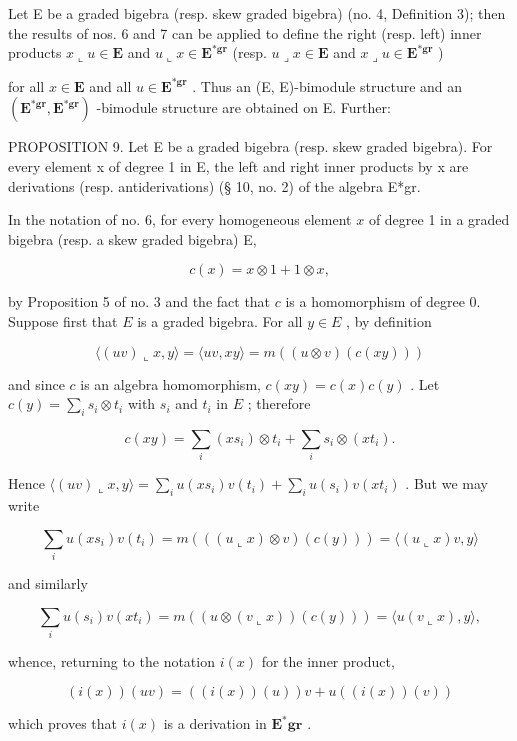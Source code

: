 Let E be a graded bigebra (resp. skew graded bigebra) (no. 4, Definition 3); then the results of nos. 6 and 7 can be applied to define the right (resp. left) inner products \(x \llcorner u \in \mathbf{E}\) and \(u \llcorner x \in \mathbf{E}^{*\mathbf{gr}}\) (resp. \(u \lrcorner x \in \mathbf{E}\) and \(x \lrcorner u \in \mathbf{E}^{*\mathbf{gr}}\) )

for all \(x \in \mathbf{E}\) and all \(u \in \mathbf{E}^{*\mathbf{gr}}\) . Thus an (E, E)-bimodule structure and an \((\mathbf{E}^{*\mathbf{gr}}, \mathbf{E}^{*\mathbf{gr}})\) -bimodule structure are obtained on E. Further:

PROPOSITION 9. Let E be a graded bigebra (resp. skew graded bigebra). For every element x of degree 1 in E, the left and right inner products by x are derivations (resp. antiderivations) (§ 10, no. 2) of the algebra E*gr.

In the notation of no. 6, for every homogeneous element \(x\) of degree 1 in a graded bigebra (resp. a skew graded bigebra) E,

\[
c (x) = x \otimes 1 + 1 \otimes x,
\]

by Proposition 5 of no. 3 and the fact that \(c\) is a homomorphism of degree 0. Suppose first that \(E\) is a graded bigebra. For all \(y \in E\) , by definition

\[
\langle (u v) \llcorner x, y \rangle = \langle u v, x y \rangle = m ((u \otimes v) (c (x y)))
\]

and since \(c\) is an algebra homomorphism, \(c(xy) = c(x)c(y)\) . Let \(c(y) = \sum_{i} s_i \otimes t_i\) with \(s_i\) and \(t_i\) in \(E\) ; therefore

\[
c (x y) = \sum_ {i} (x s _ {i}) \otimes t _ {i} + \sum_ {i} s _ {i} \otimes (x t _ {i}).
\]

Hence \(\langle (uv) \llcorner x, y \rangle = \sum_{i} u(xs_i)v(t_i) + \sum_{i} u(s_i)v(xt_i)\) . But we may write

\[
\sum_ {i} u (x s _ {i}) v (t _ {i}) = m (((u \llcorner x) \otimes v) (c (y))) = \langle (u \llcorner x) v, y \rangle
\]

and similarly

\[
\sum_ {i} u (s _ {i}) v (x t _ {i}) = m ((u \otimes (v \llcorner x)) (c (y))) = \langle u (v \llcorner x), y \rangle ,
\]

whence, returning to the notation \(i(x)\) for the inner product,

\[
(i (x)) (u v) = ((i (x)) (u)) v + u ((i (x)) (v))\tag{64}
\]

which proves that \(i(x)\) is a derivation in \(\mathbf{E}^{*}\mathbf{gr}\) .

